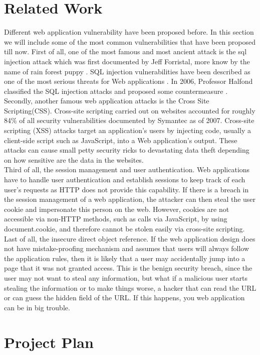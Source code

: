 \documentclass[12pt, a4paper]{article}
\begin{document}
\section{Related Work}
Different web application vulnerability have been proposed before. In this section we will include some of the most common vulnerabilities that have been proposed till now. First of all, one of the most famous and most ancient attack is the sql injection attack which was first documented by Jeff Forristal, more know by the name of rain forest puppy \cite{Jeff}.  SQL injection vulnerabilities have been described as one of the most serious threats for Web applications \cite{Aucsmith} \cite{TO}. In 2006, Professor Halfond classified the SQL injection attacks and proposed some countermeasure \cite{halfond06mar}.\\

Secondly, another famous web application attacks is the Cross Site Scripting(CSS). Cross-site scripting carried out on websites accounted for roughly 84\% of all security vulnerabilities documented by Symantec as of 2007\cite{symantec}. Cross-site scripting (XSS) attacks target an application's users by injecting code, usually a client-side script such as JavaScript, into a Web application's output. These attacks can cause small petty security ricks to devastating data theft depending on how sensitive are the data in the websites.\\

Third of all, the session management and user authentication. Web applications have to handle user authentication and establish sessions to keep track of each user's requests as HTTP does not provide this capability. If there is a breach in the session management of a web application, the attacker can then steal the user cookie and impersonate this person on the web. However, cookies are not accessible via non-HTTP methods, such as calls via JavaScript, by using document.cookie, and therefore cannot be stolen easily via cross-site scripting\cite{symantec}.\\

Last of all, the insecure direct object reference. If the web application design does not have mistake-proofing mechanism and assumes that users will always follow the application rules, then it is likely that a user may accidentally jump into a page that it was not granted access. This is the benign security breach, since the user may not want to steal any information, but what if a malicious user starts stealing the information or to make things worse, a hacker that can read the URL or can guess the hidden field of the URL\cite{Michael}. If this happens, you web application can be in big trouble.


\section{Project Plan}



\end{document}
